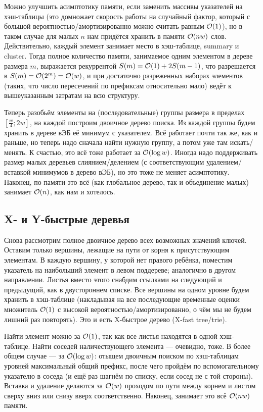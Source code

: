 Можно улучшить асимптотику памяти, если заменить массивы указателей на хэш-таблицы (это домножает скорость работы на случайный фактор, который с большой вероятностью/амортизированно можно считать равным $\mathcal{O}(1)$), но в таком случае для малых $n$ нам придётся хранить в памяти $\mathcal{O}(nw)$ слов. Действительно, каждый элемент занимает место в хэш-таблице, summary и cluster. Тогда полное количество памяти, занимаемое одним элементом в дереве размера $m$, выражается рекуррентой $S(m) = \mathcal{O}(1) + 2S(m-1)$, что разрешается в $S(m) = \mathcal{O}(2^m) = \mathcal{O}(w)$, и при достаточно разреженных наборах элементов (таких, что число пересечений по префиксам относительно мало) ведёт к вышеуказанным затратам на всю структуру.

Теперь разобьём элементы на (последовательные) группы размера в пределах $[\frac{w}{4}; 2w]$, на каждой построим двоичное дерево поиска. Из каждой группы будем хранить в дереве вЭБ её минимум с указателем. Всё работает почти так же, как и раньше, но теперь надо сначала найти нужную группу, а потом уже там искать/менять. К счастью, это всё тоже работает за $\mathcal{O}(\log w)$. Иногда надо поддерживать размер малых деревьев слиянием/делением (с соответствующим удалением/вставкой минимумов в дерево вЭБ), но это тоже не меняет асимптотику. Наконец, по памяти это всё (как глобальное дерево, так и объединение малых) занимает $\mathcal{O}(n)$, как нам и хотелось.

\subsection{X- и Y-быстрые деревья}

Снова рассмотрим полное двоичное дерево всех возможных значений ключей. Оставим только вершины, лежащие на пути от корня к присутствующим элементам. В каждую вершину, у которой нет правого ребёнка, поместим указатель на наибольший элемент в левом поддереве; аналогично в другом направлении. Листья вместо этого снабдим ссылками на следующий и предыдущий, как в двустороннем списке. Все вершины на одном уровне будем хранить в хэш-таблице (накладывая на все последующие временные оценки множитель $\mathcal{O}(1)$ с высокой вероятностью/амортизированно, о чём мы не будем лишний раз повторять). Это и есть X-быстрое дерево (X-fast tree/trie).

Найти элемент можно за $\mathcal{O}(1)$, так как все листья находятся в одной хэш-таблице. Найти соседей наличествующего элемента --- очевидно, тоже. В более общем случае --- за $\mathcal{O}(\log w)$: отыщем двоичным поиском по хэш-таблицам уровней максимальный общий префикс, после чего пройдём по вспомогательному указателю в соседа (и ещё раз шагнём по списку, если сосед не с той стороны). Вставка и удаление делаются за $\mathcal{O}(w)$ проходом по пути между корнем и листом сверху вниз или снизу вверх соответственно. Наконец, занимает это всё $\mathcal{O}(nw)$ памяти.


